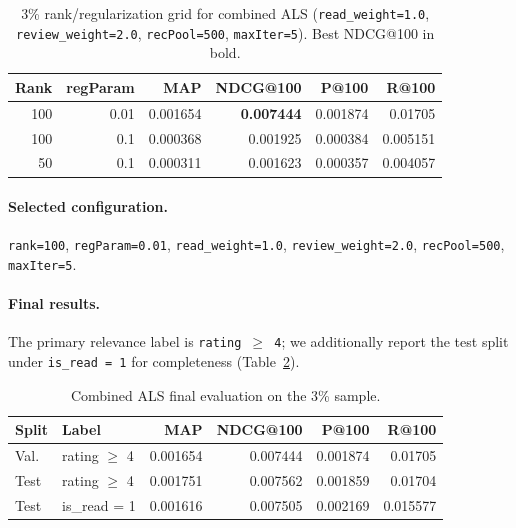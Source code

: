 \documentclass[10pt,twocolumn]{article}
\begin{document}
\begin{table}[!ht]
\centering
\caption{3\% rank/regularization grid for combined ALS (\texttt{read\_weight=1.0}, \texttt{review\_weight=2.0}, \texttt{recPool=500}, \texttt{maxIter=5}). Best NDCG@100 in bold.}
\label{tab:combined-grid}
\footnotesize
\setlength{\tabcolsep}{3pt}
\begin{tabular}{r r r r r r}
\toprule
\textbf{Rank} & \textbf{regParam} & \textbf{MAP} & \textbf{NDCG@100} & \textbf{P@100} & \textbf{R@100} \\
\midrule
100 & 0.01 & 0.001654 & \textbf{0.007444} & 0.001874 & 0.01705 \\
100 & 0.1  & 0.000368 & 0.001925          & 0.000384 & 0.005151 \\
50  & 0.1  & 0.000311 & 0.001623          & 0.000357 & 0.004057 \\
\bottomrule
\end{tabular}
\end{table}

\paragraph{Selected configuration.} \texttt{rank=100}, \texttt{regParam=0.01}, \texttt{read\_weight=1.0}, \texttt{review\_weight=2.0}, \texttt{recPool=500}, \texttt{maxIter=5}.

\paragraph{Final results.} The primary relevance label is \texttt{rating $\geq$ 4}; we additionally report the test split under \texttt{is\_read = 1} for completeness (Table~\ref{tab:combined-final}).

\begin{table}[!ht]
\centering
\caption{Combined ALS final evaluation on the 3\% sample.}
\label{tab:combined-final}
\footnotesize
\setlength{\tabcolsep}{3pt}
\begin{tabular}{l l r r r r}
\toprule
\textbf{Split} & \textbf{Label} & \textbf{MAP} & \textbf{NDCG@100} & \textbf{P@100} & \textbf{R@100} \\
\midrule
Val.  & rating $\geq$ 4 & 0.001654 & 0.007444 & 0.001874 & 0.01705 \\
Test  & rating $\geq$ 4 & 0.001751 & 0.007562 & 0.001859 & 0.01704 \\
Test  & is\_read = 1    & 0.001616 & 0.007505 & 0.002169 & 0.015577 \\
\bottomrule
\end{tabular}
\end{table}
\end{document}
